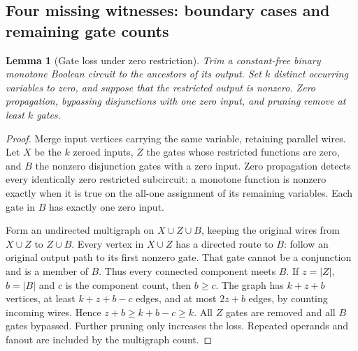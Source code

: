 \documentclass[11pt]{article}
\newtheorem{lemma}[theorem]{Lemma}
\theoremstyle{definition}
\theoremstyle{remark}
\begin{document}
\subsection{Four missing witnesses: boundary cases and remaining gate counts}

\begin{lemma}[Gate loss under zero restriction]\label{lem:zerorestriction}
Trim a constant-free binary monotone Boolean circuit to the ancestors of its output. Set $k$ distinct occurring variables to zero, and suppose that the restricted output is nonzero. Zero propagation, bypassing disjunctions with one zero input, and pruning remove at least $k$ gates.
\end{lemma}
\begin{proof}
Merge input vertices carrying the same variable, retaining parallel wires. Let $X$ be the $k$ zeroed inputs, $Z$ the gates whose restricted functions are zero, and $B$ the nonzero disjunction gates with a zero input. Zero propagation detects every identically zero restricted subcircuit: a monotone function is nonzero exactly when it is true on the all-one assignment of its remaining variables. Each gate in $B$ has exactly one zero input.

Form an undirected multigraph on $X\cup Z\cup B$, keeping the original wires from $X\cup Z$ to $Z\cup B$. Every vertex in $X\cup Z$ has a directed route to $B$: follow an original output path to its first nonzero gate. That gate cannot be a conjunction and is a member of $B$. Thus every connected component meets $B$. If $z=|Z|$, $b=|B|$ and $c$ is the component count, then $b\ge c$. The graph has $k+z+b$ vertices, at least $k+z+b-c$ edges, and at most $2z+b$ edges, by counting incoming wires. Hence $z+b\ge k+b-c\ge k$. All $Z$ gates are removed and all $B$ gates bypassed. Further pruning only increases the loss. Repeated operands and fanout are included by the multigraph count.
\end{proof}
\end{document}
